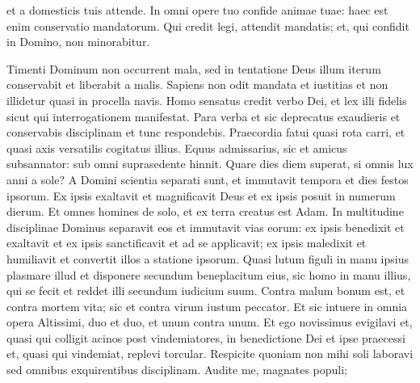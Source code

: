 \begin{biblechapter}
\begin{biblechapter}
\begin{biblechapter}
\begin{biblechapter}
\begin{biblechapter}
\begin{biblechapter}
\begin{biblechapter}
\begin{biblechapter}
\begin{biblechapter}
\begin{biblechapter}
\begin{biblechapter}
\begin{biblechapter}
\begin{biblechapter}
\begin{biblechapter}
\begin{biblechapter}
\begin{biblechapter}
\begin{biblechapter}
\begin{biblechapter}
\begin{biblechapter}
\begin{biblechapter}
\begin{biblechapter}
\begin{biblechapter}
\begin{biblechapter}
\begin{biblechapter}
\begin{biblechapter}
\begin{biblechapter}
\begin{biblechapter}
\begin{biblechapter}
\begin{biblechapter}
\begin{biblechapter}
\begin{biblechapter}
\begin{biblechapter}
 et a domesticis tuis attende.
 \verse In omni opere tuo confide animae tuae:
 haec est enim conservatio mandatorum.
 \verse Qui credit legi, attendit mandatis;
 et, qui confidit in Domino, non minorabitur.
 
\begin{biblechapter}
\verse Timenti Dominum non occurrent mala,
 sed in tentatione Deus illum iterum conservabit et liberabit a malis.
 \verse Sapiens non odit mandata et iustitias
 et non illidetur quasi in procella navis.
 \verse Homo sensatus credit verbo Dei,
 et lex illi fidelis sicut qui interrogationem manifestat.
 \verse Para verba et sic deprecatus exaudieris
 et conservabis disciplinam et tunc respondebis.
 \verse Praecordia fatui quasi rota carri,
 et quasi axis versatilis cogitatus illius.
 \verse Equus admissarius, sic et amicus subsannator:
 sub omni suprasedente hinnit.
 \verse Quare dies diem superat,
 si omnis lux anni a sole?
 \verse A Domini scientia separati sunt,
 \verse et immutavit tempora et dies festos ipsorum.
 \verse Ex ipsis exaltavit et magnificavit Deus
 et ex ipsis posuit in numerum dierum.
 Et omnes homines de solo,
 et ex terra creatus est Adam.
 \verse In multitudine disciplinae Dominus separavit eos
 et immutavit vias eorum:
 \verse ex ipsis benedixit et exaltavit
 et ex ipsis sanctificavit et ad se applicavit;
 ex ipsis maledixit et humiliavit
 et convertit illos a statione ipsorum.
 \verse Quasi lutum figuli in manu ipsius
 plasmare illud et disponere
 \verse secundum beneplacitum eius,
 sic homo in manu illius, qui se fecit
 et reddet illi secundum iudicium suum.
 \verse Contra malum bonum est,
 et contra mortem vita;
 sic et contra virum iustum peccator.
 Et sic intuere in omnia opera Altissimi,
 duo et duo, et unum contra unum.
 \verse Et ego novissimus evigilavi
 et, quasi qui colligit acinos post vindemiatores,
 \verse in benedictione Dei et ipse praecessi
 et, quasi qui vindemiat, replevi torcular.
 \verse Respicite quoniam non mihi soli laboravi
 sed omnibus exquirentibus disciplinam.
 \verse Audite me, magnates populi;

\end{biblechapter}
\end{biblechapter}
\end{biblechapter}
\end{biblechapter}
\end{biblechapter}
\end{biblechapter}
\end{biblechapter}
\end{biblechapter}
\end{biblechapter}
\end{biblechapter}
\end{biblechapter}
\end{biblechapter}
\end{biblechapter}
\end{biblechapter}
\end{biblechapter}
\end{biblechapter}
\end{biblechapter}
\end{biblechapter}
\end{biblechapter}
\end{biblechapter}
\end{biblechapter}
\end{biblechapter}
\end{biblechapter}
\end{biblechapter}
\end{biblechapter}
\end{biblechapter}
\end{biblechapter}
\end{biblechapter}
\end{biblechapter}
\end{biblechapter}
\end{biblechapter}
\end{biblechapter}
\end{biblechapter}
